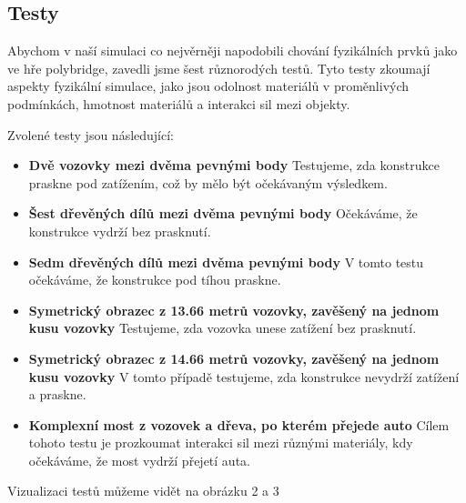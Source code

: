 \subsection{Testy}

Abychom v naší simulaci co nejvěrněji napodobili chování fyzikálních prvků jako ve hře polybridge, zavedli jsme šest různorodých testů. Tyto testy zkoumají aspekty fyzikální simulace, jako jsou odolnost materiálů v proměnlivých podmínkách, hmotnost materiálů a interakci sil mezi objekty.

Zvolené testy jsou následující:

\begin{itemize}
    \item \textbf{Dvě vozovky mezi dvěma pevnými body} Testujeme, zda konstrukce praskne pod zatížením, což by mělo být očekávaným výsledkem.
    \item \textbf{Šest dřevěných dílů mezi dvěma pevnými body} Očekáváme, že konstrukce vydrží bez prasknutí.
    \item \textbf{Sedm dřevěných dílů mezi dvěma pevnými body} V tomto testu očekáváme, že konstrukce pod tíhou praskne.
    \item \textbf{Symetrický obrazec z 13.66 metrů vozovky, zavěšený na jednom kusu vozovky} Testujeme, zda vozovka unese zatížení bez prasknutí.
    \item \textbf{Symetrický obrazec z 14.66 metrů vozovky, zavěšený na jednom kusu vozovky} V tomto případě testujeme, zda konstrukce nevydrží zatížení a praskne.
    \item \textbf{Komplexní most z vozovek a dřeva, po kterém přejede auto} Cílem tohoto testu je prozkoumat interakci sil mezi různými materiály, kdy očekáváme, že most vydrží přejetí auta.
\end{itemize}

Vizualizaci testů můžeme vidět na obrázku 2 a 3

